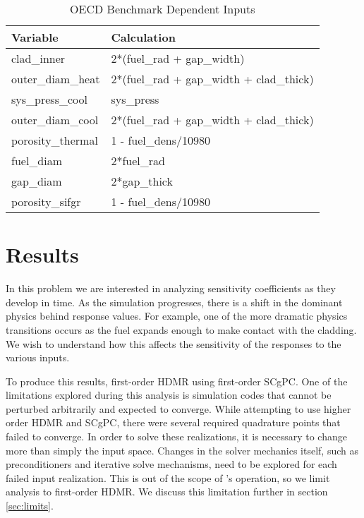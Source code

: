 \begin{table}[htb]
  \centering \footnotesize
  \begin{tabular}{l|l}\hline
Variable           & Calculation \\\hline
clad\_inner        & 2*(fuel\_rad + gap\_width) \\
outer\_diam\_heat  & 2*(fuel\_rad + gap\_width + clad\_thick) \\
sys\_press\_cool   & sys\_press \\
outer\_diam\_cool  & 2*(fuel\_rad + gap\_width + clad\_thick) \\
porosity\_thermal  & 1 - fuel\_dens/10980 \\
fuel\_diam         & 2*fuel\_rad \\
gap\_diam          & 2*gap\_thick \\
porosity\_sifgr    & 1 - fuel\_dens/10980
  \end{tabular}
  \caption{OECD Benchmark Dependent Inputs}
  \label{tab:oecd deps}
\end{table}


\section{Results}
In this problem we are interested in analyzing sensitivity coefficients as they develop in time.  As the
simulation progresses, there is a shift in the dominant physics behind response values.  For example, one of the more
dramatic physics transitions occurs as the fuel expands enough to make contact with the cladding.  We wish to
understand how this affects the sensitivity of the responses to the various inputs.  

To produce this results, first-order HDMR using first-order SCgPC.  One of the limitations
explored during this analysis is simulation codes that cannot be perturbed arbitrarily and expected to
converge.  While attempting to use higher order HDMR and SCgPC, there were several required quadrature points
that failed to converge.  In order to solve these realizations, it is necessary to change more than
simply the input space.  Changes in the solver mechanics itself, such as preconditioners and iterative solve
mechanisms, need to be explored for each failed input realization.  This is out of the scope of \raven{}'s
operation, so we limit analysis to first-order HDMR.  We discuss this limitation further in section
\ref{sec:limits}.

